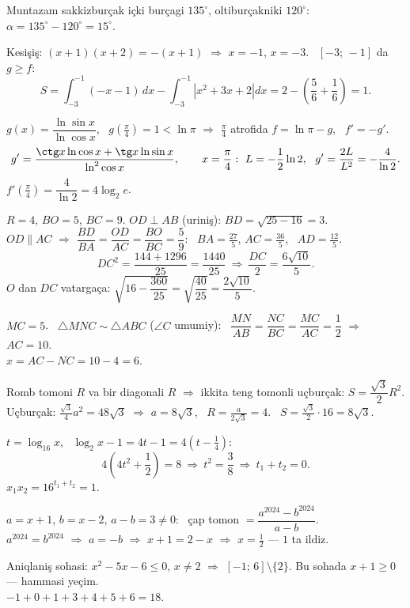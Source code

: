 Muntazam sakkizburçak içki burçagi $135^\circ$, oltiburçakniki $120^\circ$: \ $\alpha=135^\circ-120^\circ=15^\circ$.

Kesişiş: $(x+1)(x+2)=-(x+1)$ $\Rightarrow$ $x=-1$, $x=-3$. \ $[-3;\,-1]$ da $g\ge f$:
\[S=\int_{-3}^{-1}(-x-1)\,dx-\int_{-3}^{-1}\left|x^2+3x+2\right|dx=2-\left(\frac56+\frac16\right)=1.\]

$g(x)=\dfrac{\ln\sin x}{\ln\cos x}$, \ $g\left(\frac\pi4\right)=1<\ln\pi$ $\Rightarrow$ $\frac\pi4$ atrofida $f=\ln\pi-g$, \ $f'=-g'$.
\[g'=\frac{\ctg x\ln\cos x+\tg x\ln\sin x}{\ln^2\cos x},\qquad x=\frac\pi4:\ L=-\frac12\ln2,\ \ g'=\frac{2L}{L^2}=-\frac4{\ln2}.\]
$f'\left(\frac\pi4\right)=\dfrac4{\ln2}=4\log_2e$.

$R=4$, $BO=5$, $BC=9$. $OD\perp AB$ (uriniş): $BD=\sqrt{25-16}=3$.\\
$OD\parallel AC$ $\Rightarrow$ $\dfrac{BD}{BA}=\dfrac{OD}{AC}=\dfrac{BO}{BC}=\dfrac59$: \ $BA=\frac{27}5$, $AC=\frac{36}5$, \ $AD=\frac{12}5$.
\[DC^2=\frac{144+1296}{25}=\frac{1440}{25}\ \Rightarrow\ \frac{DC}2=\frac{6\sqrt{10}}5.\]
$O$ dan $DC$ vatargaça: $\sqrt{16-\dfrac{360}{25}}=\sqrt{\dfrac{40}{25}}=\dfrac{2\sqrt{10}}5$.

$MC=5$. \ $\triangle MNC\sim\triangle ABC$ ($\angle C$ umumiy): \ $\dfrac{MN}{AB}=\dfrac{NC}{BC}=\dfrac{MC}{AC}=\dfrac12$ $\Rightarrow$ $AC=10$.\\
$x=AC-NC=10-4=6$.

Romb tomoni $R$ va bir diagonali $R$ $\Rightarrow$ ikkita teng tomonli uçburçak: $S=\dfrac{\sqrt3}2R^2$.\\
Uçburçak: $\frac{\sqrt3}4a^2=48\sqrt3$ $\Rightarrow$ $a=8\sqrt3$, \ $R=\frac a{2\sqrt3}=4$. \ $S=\frac{\sqrt3}2\cdot16=8\sqrt3$.

$t=\log_{16}x$, \ $\log_2x-1=4t-1=4\left(t-\frac14\right)$:
\[4\left(4t^2+\frac12\right)=8\ \Rightarrow\ t^2=\frac38\ \Rightarrow\ t_1+t_2=0.\]
$x_1x_2=16^{t_1+t_2}=1$.

$a=x+1$, $b=x-2$, $a-b=3\ne0$: \ çap tomon $=\dfrac{a^{2024}-b^{2024}}{a-b}$.\\
$a^{2024}=b^{2024}$ $\Rightarrow$ $a=-b$ $\Rightarrow$ $x+1=2-x$ $\Rightarrow$ $x=\frac12$ — $1$ ta ildiz.

Aniqlaniş sohasi: $x^2-5x-6\le0$, $x\ne2$ $\Rightarrow$ $[-1;\,6]\setminus\{2\}$. Bu sohada $x+1\ge0$ — hammasi yeçim.\\
$-1+0+1+3+4+5+6=18$.

